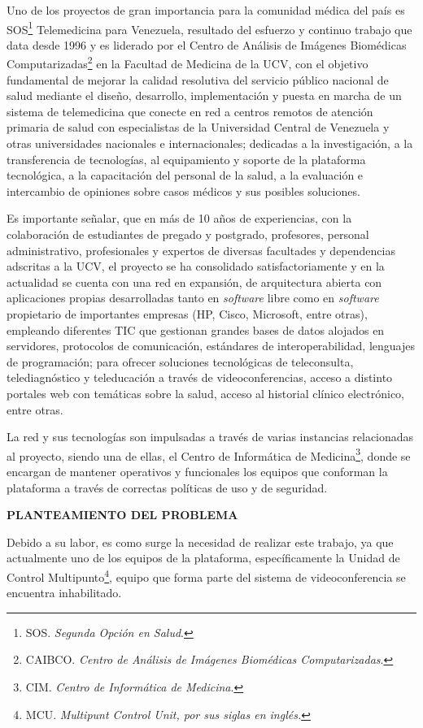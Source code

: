 \documentclass[12pt,letterpaper]{article}
\begin{document}
Uno de los proyectos de gran importancia para la comunidad médica del país es SOS\footnote{SOS. \emph{Segunda Opción en Salud}.} Telemedicina para Venezuela, resultado del esfuerzo y continuo trabajo que data desde 1996 y es liderado por el Centro de Análisis de Imágenes Biomédicas Computarizadas\footnote{CAIBCO. \emph{Centro de Análisis de Imágenes Biomédicas Computarizadas}.} en la Facultad de Medicina de la UCV, con el objetivo fundamental de mejorar la calidad resolutiva del servicio público nacional de salud mediante el diseño, desarrollo, implementación y puesta en marcha de un sistema de telemedicina que conecte en red a centros remotos de atención primaria de salud con especialistas de la Universidad Central de Venezuela y otras universidades nacionales e internacionales; dedicadas a la investigación, a la transferencia de tecnologías, al equipamiento y soporte de la plataforma tecnológica, a la capacitación del personal de la salud, a la evaluación e intercambio de opiniones sobre casos médicos y sus posibles soluciones. 

Es importante señalar, que en más de 10 años de experiencias, con la colaboración de estudiantes de pregado y postgrado, profesores, personal administrativo, profesionales y expertos de diversas facultades y dependencias adscritas a la UCV, el proyecto se ha consolidado satisfactoriamente y en la actualidad se cuenta con una red en expansión, de arquitectura abierta con aplicaciones propias desarrolladas tanto en \emph{software} libre como en \emph{software} propietario de importantes empresas (HP, Cisco, Microsoft, entre otras), empleando diferentes TIC que gestionan grandes bases de datos alojados en servidores, protocolos de comunicación, estándares de interoperabilidad, lenguajes de programación; para ofrecer soluciones tecnológicas de teleconsulta, telediagnóstico y teleducación a través de videoconferencias, acceso a distinto portales web con temáticas sobre la salud, acceso al historial clínico electrónico, entre otras. 

La red y sus tecnologías son impulsadas a través de varias instancias relacionadas al proyecto, siendo una de ellas, el Centro de Informática de Medicina\footnote{CIM. \emph{Centro de Informática de Medicina}.}, donde se encargan de mantener operativos y funcionales los equipos que conforman la plataforma a través de correctas políticas de uso y de seguridad. 
   
\centerline{\textbf{PLANTEAMIENTO DEL PROBLEMA}}


Debido a su labor, es como surge la necesidad de realizar este trabajo, ya que actualmente uno de los equipos de la plataforma, específicamente la Unidad de Control Multipunto\footnote{MCU. \emph{Multipunt Control Unit, por sus siglas en inglés.}}, equipo que forma parte del sistema de videoconferencia se encuentra inhabilitado.
\end{document}

